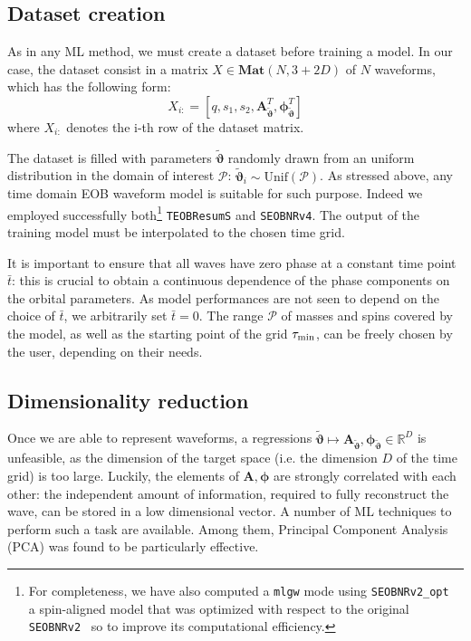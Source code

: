 \documentclass[twocolumn,showpacs,preprintnumbers,nofootinbib,prd,
superscriptaddress,10pt]{revtex4-1}
\newcommand{\R}{\mathbb{R}}
\begin{document}
\subsection{Dataset creation}
\label{sec:trainingset}
As in any ML method, we must create a dataset before training a model.
In our case, the dataset consist in a matrix ${X \in \mathbf{Mat}(N,3+2D)}$ of $N$ waveforms, which has the following form:
\begin{equation} \label{eq:dataset}
	X_{i:} = [q,s_1,s_2, \boldsymbol{A}_{{\tilde{\boldsymbol{\vartheta}}}}^T, \boldsymbol{\phi}_{{\tilde{\boldsymbol{\vartheta}}}}^T]
\end{equation}
where $X_{i:}$ denotes the i-th row of the dataset matrix.

The dataset is filled with parameters ${\tilde{\boldsymbol{\vartheta}}}$ randomly drawn from an uniform distribution in the domain of interest $\mathcal{P}$: ${\tilde{\boldsymbol{\vartheta}}}_i \sim \textrm{Unif}(\mathcal{P})$.
As stressed above, any time domain EOB waveform model is suitable for such purpose. Indeed we employed 
successfully both\footnote{For completeness, we have also computed a {\tt mlgw} 
mode using \texttt{SEOBNRv2\_opt}~\cite{Devine:2016ovp}  a spin-aligned model that was optimized
with respect to the original \texttt{SEOBNRv2}~\cite{Taracchini:2013rva} 
so to improve its computational efficiency.} \texttt{TEOBResumS} and \texttt{SEOBNRv4}.
The output of the training model must be interpolated to the chosen time grid.

It is important to ensure that all waves have zero phase at a constant
time point $\bar{t}$: this is crucial to obtain a continuous
dependence of the phase components on the orbital parameters. As model
performances are not seen to depend on the choice of
$\bar{t}$, we arbitrarily set $\bar{t} = 0$.
The range $\mathcal{P}$ of masses and spins covered by the model, as 
well as the starting point of the grid $\tau_{\rm min}$, can be freely chosen
by the user, depending on their needs.


\subsection{Dimensionality reduction}
Once we are able to represent waveforms, a regressions ${\tilde{\boldsymbol{\vartheta}}} \longmapsto \boldsymbol{A}_{{\tilde{\boldsymbol{\vartheta}}}}, \boldsymbol{\phi}_{{\tilde{\boldsymbol{\vartheta}}}} \in \R^D$ is unfeasible, as the dimension of the target space (i.e. the dimension $D$ of the time grid) is too large. Luckily, the elements of $\boldsymbol{A}, \boldsymbol{\phi}$ are strongly correlated with each other: the independent amount of information, required to fully reconstruct the wave, can be stored in a low dimensional vector.
A number of ML techniques to perform such a task are available. Among them, Principal Component Analysis (PCA) \cite[ch. 12]{murphy2012machine} was found to be particularly effective.
\end{document}
